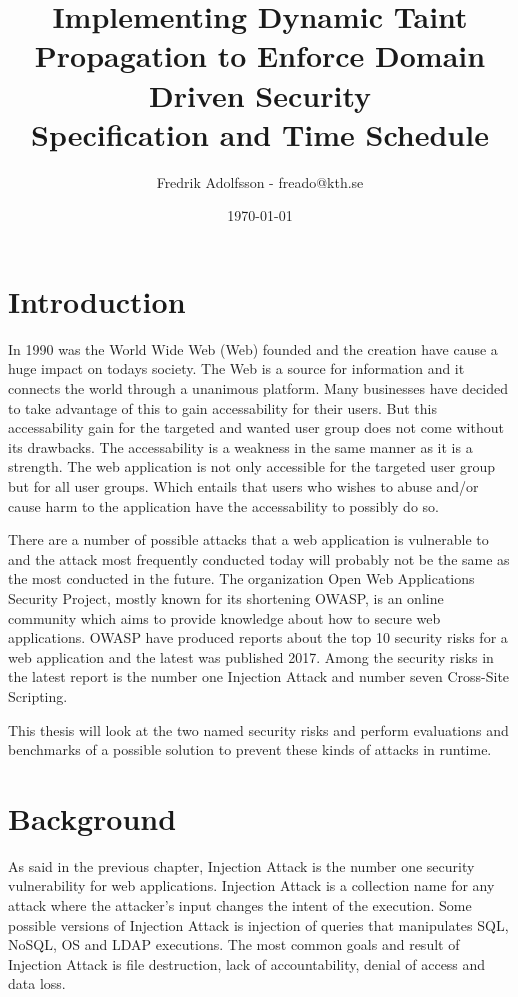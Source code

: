 \documentclass{../kththesis}
\title{Implementing Dynamic Taint Propagation to Enforce Domain Driven Security \\
        \large Specification and Time Schedule}
\author{Fredrik Adolfsson - freado@kth.se}
\date{\today}
\begin{document}
\frontmatter


\titlepage


\tableofcontents


\mainmatter



\chapter{Introduction}
In 1990 was the World Wide Web (Web) founded and the creation have cause a huge impact on todays society. \parencite{www} The Web is a source for information and it connects the world through a unanimous platform. Many businesses have decided to take advantage of this to gain accessability for their users. But this accessability gain for the targeted and wanted user group does not come without its drawbacks. The accessability is a weakness in the same manner as it is a strength. The web application is not only accessible for the targeted user group but for all user groups. Which entails that users who wishes to abuse and/or cause harm to the application have the accessability to possibly do so. 

There are a number of possible attacks that a web application is vulnerable to and the attack most frequently conducted today will probably not be the same as the most conducted in the future. The organization Open Web Applications Security Project, mostly known for its shortening OWASP, is an online community which aims to provide knowledge about how to secure web applications. \parencite{OpenWebApplicationSecurityProject} OWASP have produced reports about the top 10 security risks for a web application and the latest was published 2017. Among the security risks in the latest report is the number one Injection Attack and number seven Cross-Site Scripting. \parencite{OWASP2017, OpenWebApplicationSecurityProject, CrossMichael2007Dgtw}

This thesis will look at the two named security risks and perform evaluations and benchmarks of a possible solution to prevent these kinds of attacks in runtime. 



\chapter{Background}
As said in the previous chapter, Injection Attack is the number one security vulnerability for web applications. Injection Attack is a collection name for any attack where the attacker's input changes the intent of the execution. Some possible versions of Injection Attack is injection of queries that manipulates SQL, NoSQL, OS and LDAP executions. \parencite{OWASP2017} The most common goals and result of Injection Attack is file destruction, lack of accountability, denial of access and data loss. \parencite{Secure_Web}
\end{document}
